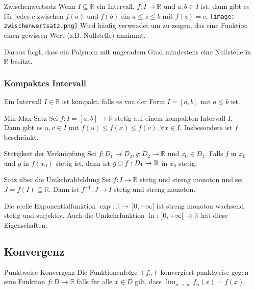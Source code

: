 \documentclass[a4paper,10pt]{article}
\def\limn{\lim_{n\to \infty}}
\def\R{\mathbb{R}}
\begin{document}
\begin{mainbox}{Zwischenwertsatz}
 Wenn $I \subseteq \R$ ein Intervall, $f: I \to \R$ und $a, b \in I$ ist, dann gibt es für jedes $c$ zwischen $f(a)$ und $f(b)$ ein $a \le z \le b$ mit $f(z) = c$.
 \texttt{[image: zwischenwertsatz.png]}
 Wird häufig verwendet um zu zeigen, das eine Funktion einen gewissen Wert (z.B. Nullstelle) annimmt.
\end{mainbox}
Daraus folgt, dass ein Polynom mit ungeradem Grad mindestens eine Nullstelle in $\R$ besitzt.

\subsubsection{Kompaktes Intervall}
Ein Intervall $I \in \R$ ist kompakt, falls es von der Form $I = [a,b]$ mit $a \le b$ ist.

\begin{mainbox}{Min-Max-Satz}
 Sei $f: I = [a,b] \to \R$ stetig auf einem kompakten Intervall $I$. Dann gibt es $u, v \in I$ mit $f(u) \le f(x) \le f(v), \forall x \in I$. Insbesondere ist $f$ beschränkt.
\end{mainbox}

\begin{subbox}{Stetigkeit der Verknüpfung}
 Sei $f: D_1 \to D_2, g: D_2 \to \R$ und $x_0 \in D_1$. Falls $f$ in $x_0$ und $g$ in $f(x_0)$ stetig ist, dann ist $g \ocircle f: D_1 \to \R$ in $x_0$ stetig.
\end{subbox}

\begin{mainbox}{Satz über die Umkehrabbildung}
 Sei $f: I \to \R$ stetig und streng monoton und sei $J = f(I) \subseteq \R$. Dann ist $f^{-1}: J \to I$ stetig und streng monoton.
\end{mainbox}

\begin{subbox}{Die reelle Exponentialfunktion}
 $\exp: \R \to \ ]0,+\infty[$ ist streng monoton wachsend, stetig und surjektiv. Auch die Umkehrfunktion $\ln: \ ]0,+\infty[ \to \R$ hat diese Eigenschaften.
\end{subbox}

\subsection{Konvergenz}

\begin{mainbox}{Punktweise Konvergenz}
  Die Funktionenfolge $(f_n)$ konvergiert punktweise gegen eine Funktion $f: D \to \R$ falls für alle $x \in D$ gilt, dass $\limn f_n(x) = f(x)$.
\end{mainbox}
\end{document}
